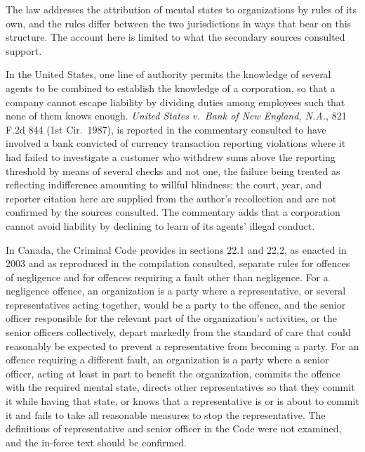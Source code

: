 \documentclass[11pt]{article}
\theoremstyle{plain}
\theoremstyle{definition}
\begin{document}
The law addresses the attribution of mental states to organizations by rules of its own, and the rules differ between the two jurisdictions in ways that bear on this structure. The account here is limited to what the secondary sources consulted support.

In the United States, one line of authority permits the knowledge of several agents to be combined to establish the knowledge of a corporation, so that a company cannot escape liability by dividing duties among employees such that none of them knows enough. \emph{United States v.\ Bank of New England, N.A.}, 821 F.2d 844 (1st Cir.\ 1987), is reported in the commentary consulted to have involved a bank convicted of currency transaction reporting violations where it had failed to investigate a customer who withdrew sums above the reporting threshold by means of several checks and not one, the failure being treated as reflecting indifference amounting to willful blindness; the court, year, and reporter citation here are supplied from the author's recollection and are not confirmed by the sources consulted. The commentary adds that a corporation cannot avoid liability by declining to learn of its agents' illegal conduct.

In Canada, the Criminal Code provides in sections 22.1 and 22.2, as enacted in 2003 and as reproduced in the compilation consulted, separate rules for offences of negligence and for offences requiring a fault other than negligence. For a negligence offence, an organization is a party where a representative, or several representatives acting together, would be a party to the offence, and the senior officer responsible for the relevant part of the organization's activities, or the senior officers collectively, depart markedly from the standard of care that could reasonably be expected to prevent a representative from becoming a party. For an offence requiring a different fault, an organization is a party where a senior officer, acting at least in part to benefit the organization, commits the offence with the required mental state, directs other representatives so that they commit it while having that state, or knows that a representative is or is about to commit it and fails to take all reasonable measures to stop the representative. The definitions of representative and senior officer in the Code were not examined, and the in-force text should be confirmed.
\end{document}
